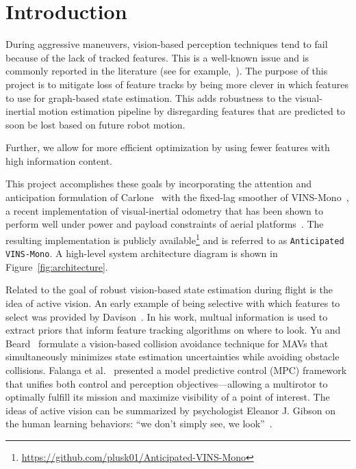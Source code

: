 
\section{Introduction}\label{sec:intro}

During aggressive maneuvers, vision-based perception techniques tend to fail because of the lack of tracked features.
This is a well-known issue and is commonly reported in the literature (see for example,~\cite{Shen2013,Falanga2017}).
The purpose of this project is to mitigate loss of feature tracks by being more clever in which features to use for graph-based state estimation.
This adds robustness to the visual-inertial motion estimation pipeline by disregarding features that are predicted to soon be lost based on future robot motion.

Further, we allow for more efficient optimization by using fewer features with high information content.

This project accomplishes these goals by incorporating the attention and anticipation formulation of Carlone~\cite{Carlone2017} with the fixed-lag smoother of VINS-Mono~\cite{Qin2018}, a recent implementation of visual-inertial odometry that has been shown to perform well under power and payload constraints of aerial platforms~\cite{Delmerico2018}.
The resulting implementation is publicly available\footnote{\url{https://github.com/plusk01/Anticipated-VINS-Mono}} and is referred to as \texttt{Anticipated VINS-Mono}.
A high-level system architecture diagram is shown in Figure~\ref{fig:architecture}.

Related to the goal of robust vision-based state estimation during flight is the idea of active vision.
An early example of being selective with which features to select was provided by Davison~\cite{Davison2005}.
In his work, multual information is used to extract priors that inform feature tracking algorithms on where to look.
Yu and Beard~\cite{Yu2013} formulate a vision-based collision avoidance technique for MAVs that simultaneously minimizes state estimation uncertainties while avoiding obstacle collisions.
Falanga et al.~\cite{Falanga2018} presented a model predictive control (MPC) framework that unifies both control and perception objectives---allowing a multirotor to optimally fulfill its mission and maximize visibility of a point of interest.
The ideas of active vision can be summarized by psychologist Eleanor J. Gibson on the human learning behaviors: ``we don't simply see, we look''~\cite{Gibson1988}.


